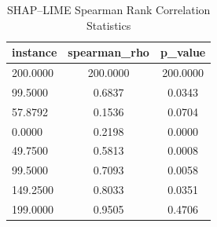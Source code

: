 \begin{table}
\centering
\caption{SHAP–LIME Spearman Rank Correlation Statistics}
\label{tab:agreement}
\begin{tabular}{lcc}
\toprule
instance & spearman_rho & p_value \\
\midrule
200.0000 & 200.0000 & 200.0000 \\
99.5000 & 0.6837 & 0.0343 \\
57.8792 & 0.1536 & 0.0704 \\
0.0000 & 0.2198 & 0.0000 \\
49.7500 & 0.5813 & 0.0008 \\
99.5000 & 0.7093 & 0.0058 \\
149.2500 & 0.8033 & 0.0351 \\
199.0000 & 0.9505 & 0.4706 \\
\bottomrule
\end{tabular}
\end{table}
